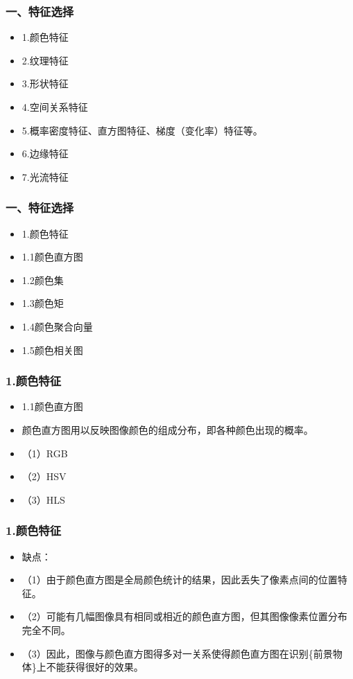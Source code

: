 \documentclass[notheorems,mathserif,table,compress]{beamer}  %
\begin{document}
\begin{frame}
  \frametitle{一、特征选择}
  \begin{itemize}
  \item 1.颜色特征
  \item 2.纹理特征
  \item 3.形状特征
  \item 4.空间关系特征
  \item 5.概率密度特征、直方图特征、梯度（变化率）特征等。
  \item 6.边缘特征
  \item 7.光流特征
  \end{itemize}
\end{frame}%

\begin{frame}
  \frametitle{一、特征选择}
  \begin{itemize}
  \item 1.颜色特征
  \item 1.1颜色直方图
  \item 1.2颜色集
  \item 1.3颜色矩
  \item 1.4颜色聚合向量
  \item 1.5颜色相关图
  \end{itemize}
\end{frame}%

\begin{frame}
  \frametitle{1.颜色特征}
  \begin{itemize}
  \item 1.1颜色直方图
  \item 颜色直方图用以反映图像颜色的组成分布，即各种颜色出现的概率。
  \item （1）RGB
  \item （2）HSV
  \item （3）HLS
  \end{itemize}
\end{frame}

\begin{frame}
  \frametitle{1.颜色特征}
  \begin{itemize}
  \item 缺点：
  \item （1）由于颜色直方图是全局颜色统计的结果，因此丢失了像素点间的位置特征。
  \item （2）可能有几幅图像具有相同或相近的颜色直方图，但其图像像素位置分布完全不同。
  \item （3）因此，图像与颜色直方图得多对一关系使得颜色直方图在识别\{前景物体\}上不能获得很好的效果。
  \end{itemize}
\end{frame}%
\end{document}

